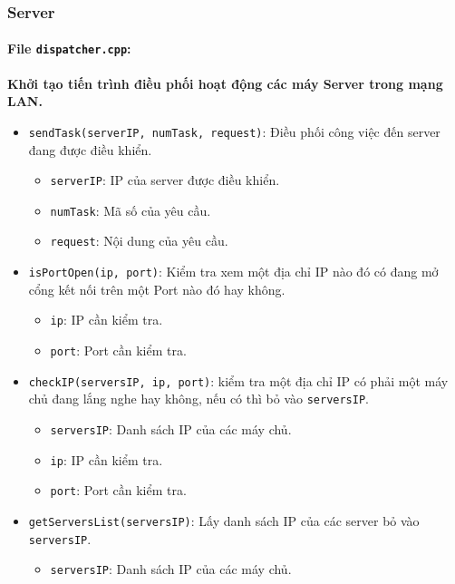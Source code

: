 \subsubsection{Server}

\paragraph{File \texttt{dispatcher.cpp}:}{\textbf{Khởi tạo tiến trình điều phối hoạt động các máy Server trong mạng LAN.}}
\begin{itemize}
    \item \texttt{sendTask(serverIP, numTask, request)}: Điều phối công việc đến server đang được điều khiển.
    \begin{itemize}
        \item \texttt{serverIP}: IP của server được điều khiển.
        \item \texttt{numTask}: Mã số của yêu cầu.
        \item \texttt{request}: Nội dung của yêu cầu.
    \end{itemize}

    \item \texttt{isPortOpen(ip, port)}: Kiểm tra xem một địa chỉ IP nào đó có đang mở cổng kết nối trên một Port nào đó hay không.
    \begin{itemize}
        \item \texttt{ip}: IP cần kiểm tra.
        \item \texttt{port}: Port cần kiểm tra.
    \end{itemize}

    \item \texttt{checkIP(serversIP, ip, port)}: kiểm tra một địa chỉ IP có phải một máy chủ đang lắng nghe hay không, nếu có thì bỏ vào \texttt{serversIP}.
    \begin{itemize}
        \item \texttt{serversIP}: Danh sách IP của các máy chủ.
        \item \texttt{ip}: IP cần kiểm tra.
        \item \texttt{port}: Port cần kiểm tra.
    \end{itemize}

    \item \texttt{getServersList(serversIP)}: Lấy danh sách IP của các server bỏ vào \texttt{serversIP}.
    \begin{itemize}
        \item \texttt{serversIP}: Danh sách IP của các máy chủ.
    \end{itemize}


\end{itemize}
